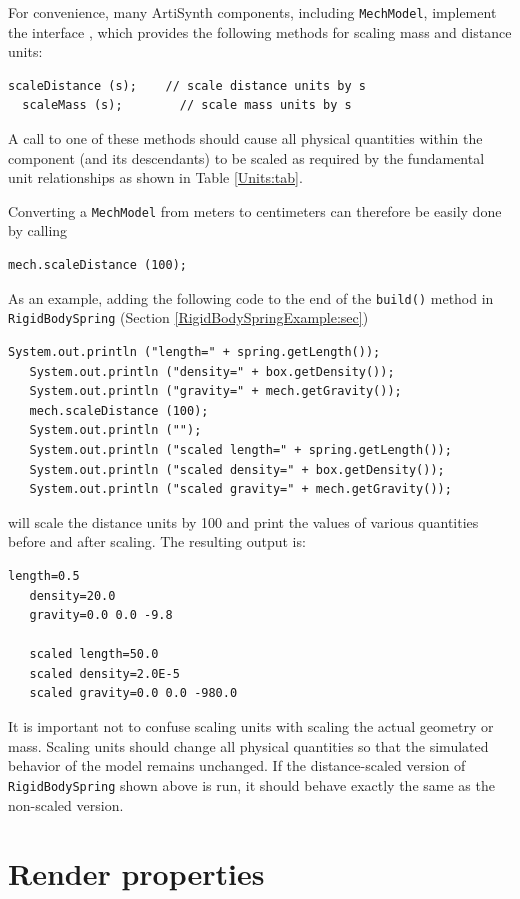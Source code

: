For convenience, many ArtiSynth components, including {\tt MechModel},
implement the interface
, which
provides the following methods for scaling mass and distance units:
\begin{lstlisting}[]
  scaleDistance (s);    // scale distance units by s
  scaleMass (s);        // scale mass units by s
\end{lstlisting}
%
A call to one of these methods should cause all physical quantities
within the component (and its descendants) to be
scaled as required by the fundamental unit relationships
as shown in Table \ref{Units:tab}.

Converting a {\tt MechModel} from meters to centimeters can therefore be
easily done by calling 
%
\begin{lstlisting}[]
   mech.scaleDistance (100);
\end{lstlisting}
%
As an example, adding the following code to the end of the {\tt build()}
method in {\tt RigidBodySpring} (Section \ref{RigidBodySpringExample:sec})
%
\begin{lstlisting}[]
   System.out.println ("length=" + spring.getLength());
   System.out.println ("density=" + box.getDensity());
   System.out.println ("gravity=" + mech.getGravity());
   mech.scaleDistance (100);
   System.out.println ("");
   System.out.println ("scaled length=" + spring.getLength());
   System.out.println ("scaled density=" + box.getDensity());
   System.out.println ("scaled gravity=" + mech.getGravity());
\end{lstlisting}
%
will scale the distance units by 100 and print the values of various
quantities before and after scaling. The resulting output is:
%
\begin{lstlisting}[]
   length=0.5
   density=20.0
   gravity=0.0 0.0 -9.8

   scaled length=50.0
   scaled density=2.0E-5
   scaled gravity=0.0 0.0 -980.0
\end{lstlisting}
%

\begin{sideblock}
It is important not to confuse scaling units with scaling the actual
geometry or mass. Scaling units should change all physical
quantities so that the simulated behavior of the model remains
unchanged.  If the distance-scaled version of {\tt RigidBodySpring}
shown above is run, it should behave exactly the same as the
non-scaled version.
\end{sideblock}

\section{Render properties}
\label{RenderProperties:sec}

